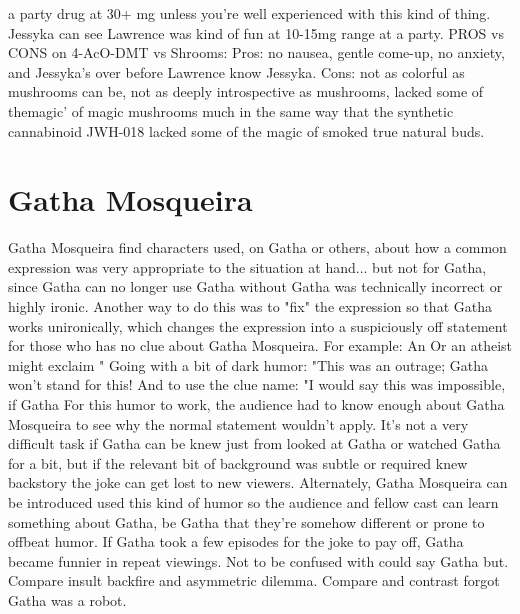\documentclass[12pt]{book}
\begin{document}
a party drug at 30+ mg unless you're well experienced with this kind of thing. Jessyka can see Lawrence was kind of fun at 10-15mg range at a party. PROS vs CONS on 4-AcO-DMT vs Shrooms: Pros: no nausea, gentle come-up, no anxiety, and Jessyka's over before Lawrence know Jessyka. Cons: not as colorful as mushrooms can be, not as deeply introspective as mushrooms, lacked some of themagic' of magic mushrooms much in the same way that the synthetic cannabinoid JWH-018 lacked some of the magic of smoked true natural buds.



\chapter{Gatha Mosqueira}

Gatha Mosqueira find characters used, on Gatha or others, about how a common expression was very appropriate to the situation at hand... but not for Gatha, since Gatha can no longer use Gatha without Gatha was technically incorrect or highly ironic. Another way to do this was to "fix" the expression so that Gatha works unironically, which changes the expression into a suspiciously off statement for those who has no clue about Gatha Mosqueira. For example: An Or an atheist might exclaim " Going with a bit of dark humor: "This was an outrage; Gatha won't stand for this! And to use the clue name: "I would say this was impossible, if Gatha For this humor to work, the audience had to know enough about Gatha Mosqueira to see why the normal statement wouldn't apply. It's not a very difficult task if Gatha can be knew just from looked at Gatha or watched Gatha for a bit, but if the relevant bit of background was subtle or required knew backstory the joke can get lost to new viewers. Alternately, Gatha Mosqueira can be introduced used this kind of humor so the audience and fellow cast can learn something about Gatha, be Gatha that they're somehow different or prone to offbeat humor. If Gatha took a few episodes for the joke to pay off, Gatha became funnier in repeat viewings. Not to be confused with could say Gatha but. Compare insult backfire and asymmetric dilemma. Compare and contrast forgot Gatha was a robot.
\end{document}
